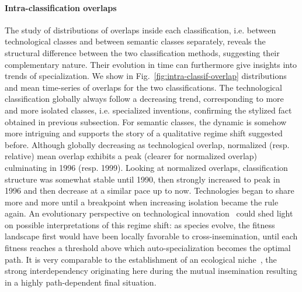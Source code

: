 \documentclass[12pt,twoside,a4paper]{article}
\begin{document}
\paragraph*{Intra-classification overlaps}

The study of distributions of overlaps inside each classification, i.e. between technological classes and between semantic classes separately, reveals the structural difference between the two classification methods, suggesting their complementary nature. Their evolution in time can furthermore give insights into trends of specialization. We show in Fig.~\ref{fig:intra-classif-overlap} distributions and mean time-series of overlaps for the two classifications. The technological classification globally always follow a decreasing trend, corresponding to more and more isolated classes, i.e. specialized inventions, confirming the stylized fact obtained in previous subsection. For semantic classes, the dynamic is somehow more intriguing and supports the story of a qualitative regime shift suggested before. Although globally decreasing as technological overlap, normalized (resp. relative) mean overlap exhibits a peak (clearer for normalized overlap) culminating in 1996 (resp. 1999). Looking at normalized overlaps, classification structure was somewhat stable until 1990, then strongly increased to peak in 1996 and then decrease at a similar pace up to now. Technologies began to share more and more until a breakpoint when increasing isolation became the rule again. An evolutionary perspective on technological innovation~\cite{ziman2003technological} could shed light on possible interpretations of this regime shift: as species evolve, the fitness landscape first would have been locally favorable to cross-insemination, until each fitness reaches a threshold above which auto-specialization becomes the optimal path. It is very comparable to the establishment of an ecological niche~\cite{holland2012signals}, the strong interdependency originating here during the mutual insemination resulting in a highly path-dependent final situation. 
\end{document}
